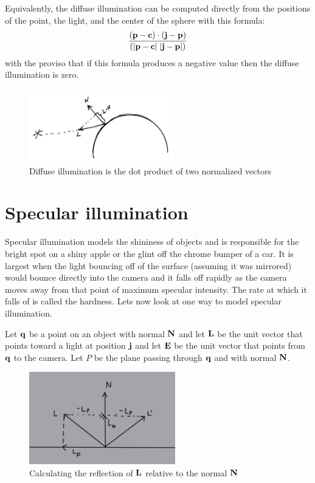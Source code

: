 \documentclass{book}
\newcommand{\vect}[1]{{\bf{ #1}}}
\begin{document}
Equivalently, the diffuse illumination can be computed directly from the positions of the point, the light, and the center of the sphere with this formula:
\[
\frac{({\vect p} - {\vect c}) \cdot ({\vect j} - {\vect p}) }
     { ( \vert {\vect p} - {\vect c}\vert  \; \vert {\vect j} - {\vect p}\vert) }
\]
with the proviso that if this formula produces a negative value then the diffuse illumination is zero.






\begin{figure}[h]
\centering
\includegraphics[width=2.5in]{images/diffuse.jpg}
\caption{Diffuse illumination is the dot product of two normalized vectors}
\end{figure}



\section{Specular illumination}
Specular illumination models the shininess of objects and is responsible for the bright spot on a
shiny apple or the glint off the chrome bumper of a car. It is largest when the light bouncing
off of the surface (assuming it was mirrored) would bounce directly into the camera and it falls
off rapidly as the camera moves away from that point of maximum specular intensity. The rate at
which it falls of is called the hardness. Lets now look at one way to model specular illumination.

Let ${\vect q}$ be a point on an object with normal ${\vect N}$ and let $\vect L$ be the unit vector that points
toward a light at position $\vect j$ and let $\vect E$ be the unit vector that points from ${\vect q}$ to the camera.
Let $P$ be the plane passing through ${\vect q}$ and with normal ${\vect N}$.

\begin{figure}[h]
\centering
\includegraphics[width=2.5in]{images/reflection3.png}
\caption{Calculating the reflection of $\vect{L}$ relative to the normal $\vect{N}$ }
\end{figure}
\end{document}
